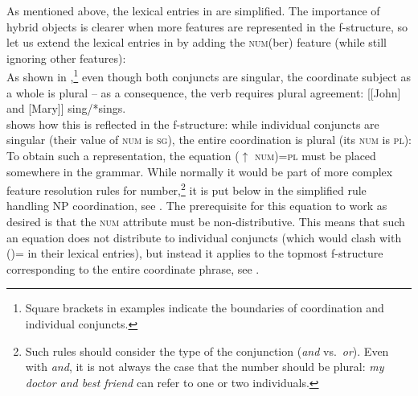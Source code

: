 \documentclass[output=paper]{../langscibook}
\begin{document}
As mentioned above, the lexical entries in  are
simplified. The importance of hybrid objects is clearer when more
features are represented in the f-structure, so let us extend the
lexical entries in  by adding the \textsc{num}(ber) feature (while still
ignoring other features):
\ea\label{ex:lexicon:basic:num}
 \\
\z
As shown in ,\footnote{Square brackets in
  examples indicate the boundaries of coordination and individual conjuncts.} even though both conjuncts are
singular, the coordinate subject as a whole is plural – as a
consequence, the verb requires plural agreement:
\ea\label{ex:sing:agr:pl} [[John] and [Mary]] sing/*sings.\z
\ea\label{ex:lexicon:basic:verb}
 \\
    \z
{} shows how this is reflected in
the f-structure: while individual conjuncts are singular (their value of \textsc{num} is \textsc{sg}), the entire coordination is plural (its \textsc{num} is \textsc{pl}):
\ea\label{ex:fstr:NP:John:Mary:basic:num}
\z
To obtain such a representation, the equation \textsc{($\uparrow$
  num)=pl} must be placed somewhere in the grammar. While normally
it would be part of more complex feature resolution rules for
number,\footnote{Such rules should consider the type of
  the conjunction (\emph{and} vs.\ \emph{or}). Even with \emph{and}, it
  is not always the case that the number should be plural: \emph{my
    doctor and best friend} can refer to one or two individuals.} it is put
below in the simplified rule handling NP coordination, see
.
\ea\label{ex:cstr:coord:preconj:NP}
\z
The prerequisite for
this equation to work as desired is that the \textsc{num} attribute
must be non-distributive. This means that such an equation does not
distribute to individual conjuncts (which would clash with
\textsc{(\UP\NUM)=\SG} in their lexical entries),
but instead it applies to the topmost f-structure corresponding to
the entire coordinate phrase, see .
\end{document}
